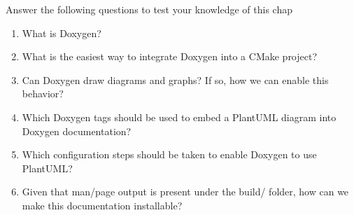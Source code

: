 Answer the following questions to test your knowledge of this chap

\begin{enumerate}
\item 
What is Doxygen?

\item 
What is the easiest way to integrate Doxygen into a CMake project?

\item 
Can Doxygen draw diagrams and graphs? If so, how we can enable this behavior?

\item 
Which Doxygen tags should be used to embed a PlantUML diagram into Doxygen documentation?

\item 
Which configuration steps should be taken to enable Doxygen to use PlantUML?

\item 
Given that man/page output is present under the build/ folder, how can we make this documentation installable?
\end{enumerate}